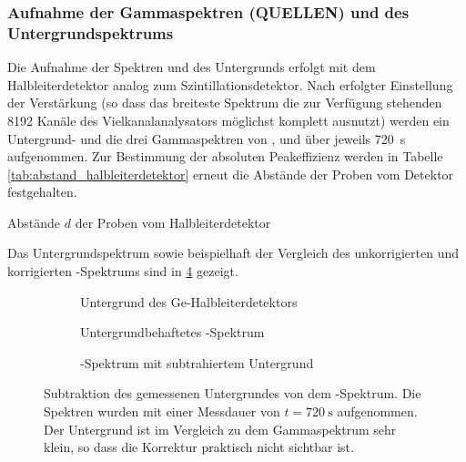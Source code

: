 \documentclass[11pt, a4paper]{article}
\numberwithin{equation}{section}
\newcommand{\co}{\isotope[60]{Co}}
\newcommand{\cs}{\isotope[137]{Cs}}
\begin{document}
\subsubsection{Aufnahme der Gammaspektren (QUELLEN) und des Untergrundspektrums}
Die Aufnahme der Spektren und des Untergrunds erfolgt mit dem Halbleiterdetektor analog zum Szintillationsdetektor.
Nach erfolgter Einstellung der Verstärkung (so dass das breiteste Spektrum die zur Verfügung stehenden 8192 Kanäle des Vielkanalanalysators möglichst komplett ausnutzt) werden ein Untergrund- und die drei Gammaspektren von \co{}, \cs{} und  über jeweils \SI{720}{\second} aufgenommen.
Zur Bestimmung der absoluten Peakeffizienz werden in Tabelle \ref{tab:abstand_halbleiterdetektor} erneut die Abstände der Proben vom Detektor festgehalten.
\begin{table}[h]
	\centering
	
	\caption{Abstände $d$ der Proben vom Halbleiterdetektor}
	\label{tab:abstand_halbleiterdetektor}
\end{table}
Das Untergrundspektrum sowie beispielhaft der Vergleich des unkorrigierten und korrigierten \cs-Spektrums sind in \ref{fig:abzug_untergrund_halb} gezeigt.
\begin{figure}[hp]
	\centering
	\begin{subfigure}[b]{0.65\textwidth}
		\resizebox{!}{0.285\textheight}{
			
		}
		\caption{Untergrund des Ge-Halbleiterdetektors}
		\label{fig:untergrund_halb}
	\end{subfigure}
	
	\begin{subfigure}[b]{0.65\textwidth}
		\resizebox{!}{0.285\textheight}{
			
		}
		\caption{Untergrundbehaftetes -Spektrum}
		\label{fig:caesium_mit_untergrund}
	\end{subfigure}
	
	\begin{subfigure}[b]{0.65\textwidth}
		\resizebox{!}{0.285\textheight}{
			
		}
		\caption{-Spektrum mit subtrahiertem Untergrund}
		\label{fig:caesium_ohne_untergrund}
	\end{subfigure}
	\caption{Subtraktion des gemessenen Untergrundes von dem -Spektrum. Die Spektren wurden mit einer Messdauer von $t = \SI{720}{\second}$ aufgenommen. Der Untergrund ist im Vergleich zu dem Gammaspektrum sehr klein, so dass die Korrektur praktisch nicht sichtbar ist.}
	\label{fig:abzug_untergrund_halb}
\end{figure}
\end{document}
